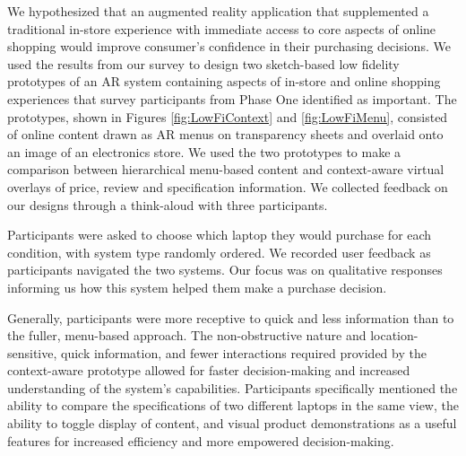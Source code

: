 We hypothesized that an augmented reality application that supplemented a traditional in-store experience with immediate access to core aspects of online shopping would improve consumer's confidence in their purchasing decisions.   We used the results from our survey to design two sketch-based low fidelity prototypes of an AR system containing aspects of in-store and online shopping experiences that survey participants from Phase One identified as important. The prototypes, shown in Figures \ref{fig:LowFiContext} and \ref{fig:LowFiMenu}, consisted of online content drawn as AR menus on transparency sheets and overlaid onto an image of an electronics store. 
We used the two prototypes to make a comparison between hierarchical menu-based content and context-aware virtual overlays of price, review and specification information. We collected feedback on our designs through a think-aloud with three participants.

Participants were asked to choose which laptop they would purchase for each condition, with system type randomly ordered.    We recorded user feedback as participants navigated the two systems. Our focus was on qualitative responses informing us how this system helped them make a purchase decision.

Generally, participants were more receptive to quick and less information than to the fuller, menu-based approach. The non-obstructive nature and location-sensitive, quick information, and fewer interactions required provided by the context-aware prototype allowed for faster decision-making and increased understanding of the system's capabilities.  Participants specifically mentioned the ability to compare the specifications of two different laptops in the same view, the ability to toggle display of content, and visual product demonstrations as a useful features for increased efficiency and more empowered decision-making.

